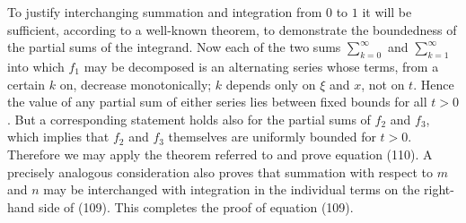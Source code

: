 To justify interchanging summation and integration from $0$ to $1$ it will be sufficient, according to a well-known theorem, to demonstrate the boundedness of the partial sums of the integrand. Now each of the two sums $\sum_{k=0}^{\infty}$ and $\sum_{k=1}^{\infty}$ into which $f_1$ may be decomposed is an alternating series whose terms, from a certain $k$ on, decrease monotonically; $k$ depends only on $\xi$ and $x$, not on $t$. Hence the value of any partial sum of either series lies between fixed bounds for all $t>0$. But a corresponding statement holds also for the partial sums of $f_2$ and $f_3$, which implies that $f_2$ and $f_3$ themselves are uniformly bounded for $t>0$. Therefore we may apply the theorem referred to and prove equation (110). A precisely analogous consideration also proves that summation with respect to $m$ and $n$ may be interchanged with integration in the individual terms on the right-hand side of (109). This completes the proof of equation (109).

